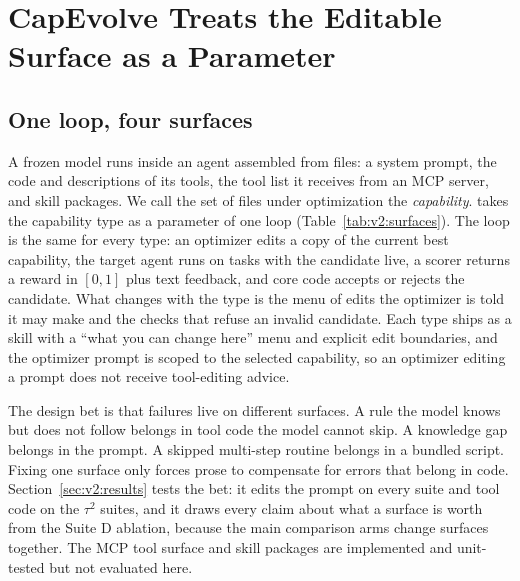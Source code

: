 \section{CapEvolve Treats the Editable Surface as a Parameter}
\label{sec:v2:capevolve}

\subsection{One loop, four surfaces}
\label{sec:v2:surface}

A frozen model runs inside an agent assembled from files: a system prompt, the code and descriptions of its tools, the tool list it receives from an MCP server, and skill packages. We call the set of files under optimization the \emph{capability}. \capevolve{} takes the capability type as a parameter of one loop (Table~\ref{tab:v2:surfaces}). The loop is the same for every type: an optimizer edits a copy of the current best capability, the target agent runs on tasks with the candidate live, a scorer returns a reward in $[0,1]$ plus text feedback, and core code accepts or rejects the candidate. What changes with the type is the menu of edits the optimizer is told it may make and the checks that refuse an invalid candidate. Each type ships as a skill with a ``what you can change here'' menu and explicit edit boundaries, and the optimizer prompt is scoped to the selected capability, so an optimizer editing a prompt does not receive tool-editing advice.

The design bet is that failures live on different surfaces. A rule the model knows but does not follow belongs in tool code the model cannot skip. A knowledge gap belongs in the prompt. A skipped multi-step routine belongs in a bundled script. Fixing one surface only forces prose to compensate for errors that belong in code. Section~\ref{sec:v2:results} tests the bet: it edits the prompt on every suite and tool code on the $\tau^2$ suites, and it draws every claim about what a surface is worth from the Suite D ablation, because the main comparison arms change surfaces together.  The MCP tool surface and skill packages are implemented and unit-tested but not evaluated here.

